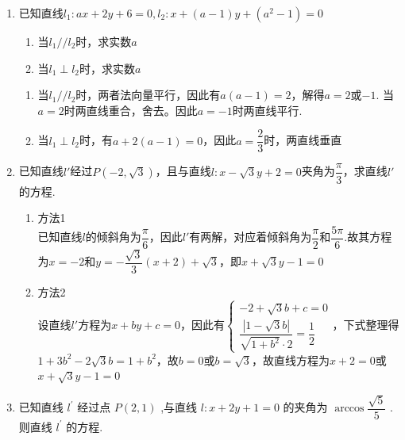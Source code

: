 \begin{enumerate}
    \item 已知直线$l_1: ax+2y+6=0, l_2: x+(a-1)y+(a^2-1) = 0$
    \begin{enumerate}
        \item 当$l_1 // l_2$时，求实数$a$
        \item 当$l_1 \perp l_2$时，求实数$a$
    \end{enumerate}
    \begin{jieda}
        \begin{enumerate}
            \item 当$l_1 // l_2$时，两者法向量平行，因此有$a(a-1) = 2$，解得$a = 2$或$-1$. 当$a = 2$时两直线重合，舍去。因此$a = -1$时两直线平行.
            \item 当$l_1 \perp l_2$时，有$a+2(a-1) = 0$，因此$a = \dfrac{2}{3}$时，两直线垂直
        \end{enumerate}
    \end{jieda}
    \item 已知直线$l'$经过$P(-2, \sqrt{3})$，且与直线$l: x-\sqrt{3}y+2=0$夹角为$\dfrac{\pi}{3}$，求直线$l'$的方程.
    \begin{jieda}
        \begin{enumerate}
            \item 方法1 \\
            已知直线$l$的倾斜角为$\dfrac{\pi}{6}$，因此$l'$有两解，对应着倾斜角为$\dfrac{\pi}{2}$和$\dfrac{5\pi}{6}$.故其方程为$x = -2$和$y = -\dfrac{\sqrt{3}}{3}(x+2)+\sqrt{3}$，即$x+\sqrt{3}y-1 = 0$
            \item 方法2 \\
            设直线$l'$方程为$x+by+c=0$，因此有$\left\{\begin{array}{l}
                 -2+\sqrt{3}b+c = 0  \\
                 \dfrac{|1-\sqrt{3}b|}{\sqrt{1+b^2} \cdot 2} = \dfrac{1}{2}
            \end{array}\right.$，下式整理得$1+3b^2-2\sqrt{3}b = 1+b^2$，故$b = 0$或$b = \sqrt{3}$，故直线方程为$x + 2 = 0$或$x+\sqrt{3}y-1 = 0$
        \end{enumerate}
    \end{jieda}
    \item 已知直线 ${l}^{\prime }$ 经过点 $P\left( {2,1}\right)$ ,与直线 $l : x + {2y} + 1 = 0$ 的夹角为 $\arccos \dfrac{\sqrt{5}}{5}$ . 则直线 ${l}^{\prime }$ 的方程.
    \begin{jieda}


\end{jieda}
\end{enumerate}
